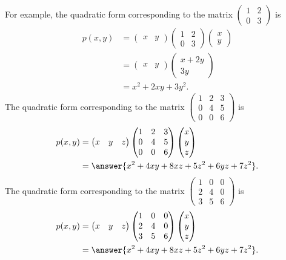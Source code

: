 \documentclass{ximera}
\begin{document}
\begin{example}
For example, the quadratic form corresponding to the matrix $\begin{pmatrix}1 & 2\\ 0 & 3\end{pmatrix}$ is
\begin{align*}
p(x,y) &= \begin{pmatrix} x & y\end{pmatrix}\begin{pmatrix}1 & 2\\ 0 & 3\end{pmatrix}\begin{pmatrix} x \\ y\end{pmatrix}\\
&= \begin{pmatrix} x & y\end{pmatrix}\begin{pmatrix} x+2y \\ 3y\end{pmatrix}\\
&= x^2+2xy+3y^2.
\end{align*}
The quadratic form corresponding to the matrix $\begin{pmatrix}1 & 2 & 3\\0 & 4 & 5\\0 & 0 & 6\end{pmatrix}$ is
\begin{align*}
p(x,y) &= \begin{pmatrix} x & y & z\end{pmatrix}\begin{pmatrix}1 & 2 & 3\\0 & 4 & 5\\0 & 0 & 6\end{pmatrix}\begin{pmatrix} x \\ y\\ z\end{pmatrix}\\
&= \answer{x^2+4xy+8xz+5z^2+6yz+7z^2}.
\end{align*}
The quadratic form corresponding to the matrix $\begin{pmatrix}1 & 0 & 0\\2 & 4 & 0\\3 & 5 & 6\end{pmatrix}$ is
\begin{align*}
p(x,y) &= \begin{pmatrix} x & y & z\end{pmatrix}\begin{pmatrix}1 & 0 & 0\\2 & 4 & 0\\3 & 5 & 6\end{pmatrix}\begin{pmatrix} x \\ y\\ z\end{pmatrix}\\
&= \answer{x^2+4xy+8xz+5z^2+6yz+7z^2}.
\end{align*}
\end{example}
\end{document}
